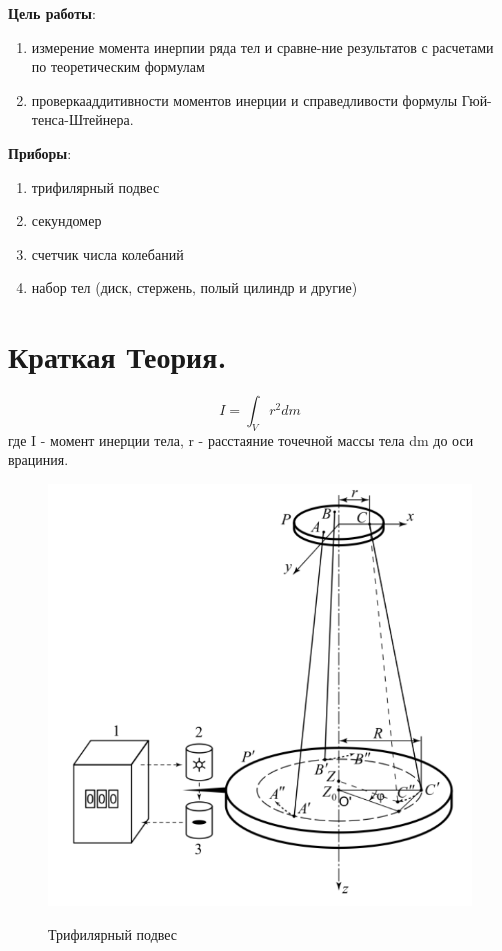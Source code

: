 \documentclass[a4paper,12pt]{article} %
\begin{document}

\textbf{Цель работы}:
\begin{enumerate}
  \item измерение момента инерпии ряда тел и сравне-ние результатов с расчетами по теоретическим формулам
  \item проверкааддитивности моментов инерции и справедливости формулы Гюй-тенса-Штейнера.
\end{enumerate}

\textbf{Приборы}:
\begin{enumerate}
\item трифилярный подвес
\item секундомер
\item счетчик числа колебаний
\item набор тел (диск, стержень, полый цилиндр и другие)
\end{enumerate}

\section{Краткая Теория.}

\begin{equation}
  I = \int_{V}{r^2 dm} \label{eq:1}
\end{equation}
где I - момент инерции тела, r - расстаяние точечной массы тела dm до оси врациния.

\begin{figure} [h] \center
  \includegraphics[scale = 0.6]{123/рис 1.png}
  \label{pic:1} \caption[Рис. 1]{Трифилярный подвес}
\end{figure}
\end{document}
